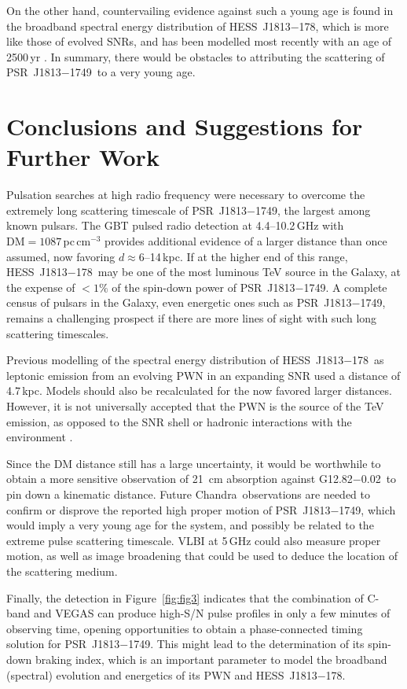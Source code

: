\documentclass[twocolumn]{aastex62}
\newcommand\chandra{{Chandra}}
\newcommand\snr{G12.82$-$0.02}
\newcommand\tev{HESS~J1813$-$178}
\newcommand\psr{PSR~J1813$-$1749}
\begin{document}
On the other hand, countervailing evidence against such a young age
is found in the broadband spectral energy distribution of \tev,
which is more like those of evolved SNRs, and has been modelled
most recently with an age of 2500\,yr \citep{zhu18}.  In summary,
there would be obstacles to attributing the scattering of \psr\ to
a very young age.

\section{Conclusions and Suggestions for Further Work} 

Pulsation searches at high radio frequency were necessary to overcome
the extremely long scattering timescale of \psr, the largest among
known pulsars.  The GBT pulsed radio detection at 4.4--10.2\,GHz
with $\mbox{DM}=1087$\,pc\,cm$^{-3}$ provides additional evidence
of a larger distance than once assumed, now favoring $d\approx6$--14\,kpc.
If at the higher end of this range, \tev\ may be one of the
most luminous TeV source in the Galaxy, at the expense of $<1\%$
of the spin-down power of \psr.  A complete census of pulsars in
the Galaxy, even energetic ones such as \psr, remains a challenging
prospect if there are more lines of sight with such long scattering
timescales.

Previous modelling of the spectral energy distribution of \tev\ as
leptonic emission from an evolving PWN in an expanding SNR
\citep{fan10,zhu18} used a distance of 4.7\,kpc.  Models should
also be recalculated for the now favored larger distances.  However,
it is not universally accepted that the PWN is the source of the
TeV emission, as opposed to the SNR shell or hadronic interactions
with the environment \citep{tor14}.

Since the DM distance still has a large uncertainty, it would be
worthwhile to obtain a more sensitive observation of 21~cm 
absorption against \snr\ to pin down a kinematic distance. Future
\chandra\ observations are needed to confirm or disprove the reported
high proper motion of \psr, which would imply a very young age for
the system, and possibly be related to the extreme pulse scattering
timescale.  VLBI at 5\,GHz could also measure proper motion, as
well as image broadening that could be used to deduce the location
of the scattering medium.

Finally, the detection in Figure~\ref{fig:fig3} indicates that the
combination of C-band and VEGAS can produce high-S/N pulse
profiles in only a few minutes of observing time, opening opportunities
to obtain a phase-connected timing solution for \psr.  This might
lead to the determination of its spin-down braking index, which is
an important parameter to model the broadband (spectral) evolution
and energetics of its PWN and \tev.
\end{document}
